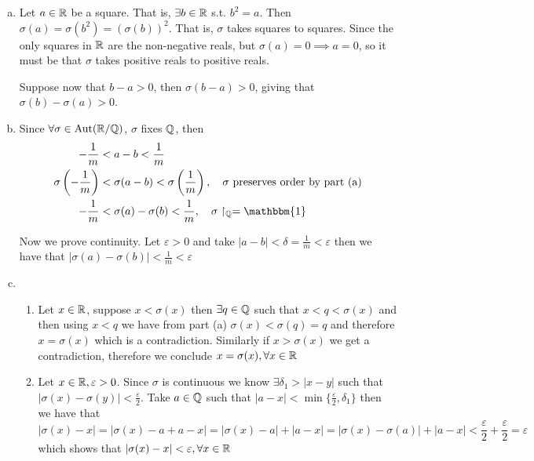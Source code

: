 \begin{solution}
    \begin{enumerate}[(a)]
        \item Let $a\in\mathbb{R}$ be a square. That is, $\exists b\in\mathbb{R}$ s.t. $b^{2}=a$. Then $\sigma(a)=\sigma(b^{2})=(\sigma(b))^{2}$. That is, $\sigma$ takes squares to squares. Since the only squares in $\mathbb{R}$ are the non-negative reals, but $\sigma(a)=0\implies a=0$, so it must be that $\sigma$ takes positive reals to positive reals.

        Suppose now that $b-a>0$, then $\sigma(b-a)>0$, giving that $\sigma(b)-\sigma(a)>0$.
        
        \item Since $\forall\sigma\in\operatorname{Aut}(\mathbb{R}/\mathbb{Q})$, $\sigma$ fixes $\mathbb{Q}$, then
        \begin{align*}
            -\frac{1}{m}&<a-b<\frac{1}{m}\\
            \sigma\left(-\frac{1}{m}\right)&<\sigma(a-b)<\sigma\left(\frac{1}{m}\right),\quad\sigma\text{ preserves order by part (a)}\\
            -\frac{1}{m}&<\sigma(a)-\sigma(b)<\frac{1}{m},\quad\sigma\restriction_{\Q}=\mathbbm{1}
        \end{align*}

        Now we prove continuity. Let $\varepsilon > 0$ and take $|a-b|<\delta = \frac{1}{m} < \varepsilon$ then we have that $|\sigma(a) - \sigma(b)| < \frac{1}{m} < \varepsilon$

        \item \begin{enumerate}[(Method 1)]
            \item Let $x \in \mathbb{R}$, suppose $x < \sigma(x)$ then $\exists q \in \mathbb{Q}$ such that $x < q < \sigma(x)$ and then using $x < q$ we have from part (a) $\sigma(x) < \sigma(q) = q$ and therefore $x = \sigma(x)$ which is a contradiction. Similarly if $x > \sigma(x)$ we get a contradiction, therefore we conclude $x = \sigma(x), \forall x \in \mathbb{R}$
            
            \item Let $x \in \mathbb{R}, \varepsilon > 0$. Since $\sigma$ is continuous we know $\exists \delta_1 > |x - y|$ such that $|\sigma(x) - \sigma(y)| < \frac{\varepsilon}{2}$. Take $a \in \mathbb{Q}$ such that $|a - x| < \min\{\frac{\varepsilon}{2}, \delta_1\}$ then we have that
            \[|\sigma(x) - x| = |\sigma(x) - a + a - x| = |\sigma(x) - a| + |a - x| = |\sigma(x) - \sigma(a)| + |a - x| < \frac{\varepsilon}{2} + \frac{\varepsilon}{2} = \varepsilon\]
            which shows that $|\sigma(x) - x| < \varepsilon, \forall x \in \mathbb{R}$
        \end{enumerate}
    \end{enumerate}
\end{solution}